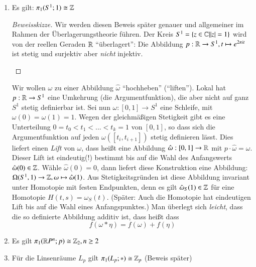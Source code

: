 \documentclass[a4paper,10pt]{scrartcl}
\newcommand{\homo}{\cong}
\begin{document}
\begin{exs*}
\begin{enumerate}[(1)]
\item Es gilt: $\pi_1(S^1; 1)\homo \Z$
\begin{proof}[Beweisskizze]
Wir werden diesen Beweis später genauer und allgemeiner im Rahmen der Überlagerungstheorie führen. Der Kreis $S^1=\{ z\in \mathbb{C}| |z|=1\}$ wird von der reellen Geraden $\mathbb{R}$ "`überlagert"': Die Abbildung $p:  \mathbb{R}\to S^1, t\mapsto e^{2\pi i t}$ ist stetig und surjektiv aber \emph{nicht} injektiv.\\
\begin{figure}[ht]
\centering

\end{figure}
\end{proof}
Wir wollen $\omega$ zu einer Abbildung $\hat\omega$ "`hochheben"' ("`liften"'). Lokal hat $p: \mathbb{R}  \to S^1$ eine Umkehrung (die Argumentfunktion), die aber nicht auf ganz $S^1$ stetig definierbar ist. Sei nun $\omega: [0,1]\to S^1$ eine Schleife, mit $\omega(0)=\omega(1)=1$. Wegen der gleichmäßigen Stetigkeit gibt es eine Unterteilung $0=t_0<t_1<...<t_k=1$ von $[0,1]$, so dass sich  die Argumentfunktion auf jeden $\omega([t_i, t_{i+1}])$ stetig definieren lässt. Dies liefert einen \emph{Lift} von $\omega$, dass heißt eine Abbildung $\hat \omega: [0,1]\to \mathbb{R}$ mit $p \cdot \hat \omega=\omega$. Dieser Lift ist eindeutig(!) bestimmt bis auf die Wahl des Anfangswerts $\hat \omega(0) \in \mathbb{Z}$. Wähle $\hat \omega(0)=0$, dann liefert diese Konstruktion eine Abbildung: $\Omega(S^1, 1)\to \mathbb{Z}, \omega \mapsto \hat \omega(1)$. Aus Stetigkeitsgründen ist diese Abbildung invariant unter Homotopie mit festen Endpunkten, denn es gilt $\hat \omega_S(1)\in \mathbb{Z}$ für eine Homotopie $H(t,s)=\omega_S(t)$. (Später: Auch die Homotopie hat eindeutigen Lift bis auf die Wahl eines Anfangspunktes.) Man überlegt sich \emph{leicht}, dass die so definierte Abbildung additiv ist, dass heißt dass
\[
 f(\omega*\eta)=f(\omega)+f(\eta)
\]
\item Es gilt $\pi_1(\R P^n; p)\homo \Z_2, n\ge 2$
 \begin{table}[h]
 \end{table}
\item Für die Linsenräume $L_p$ gilt $\pi_1(L_p;*)\homo \Z_p$ (Beweis später)


\end{enumerate}
\end{exs*}
\end{document}
